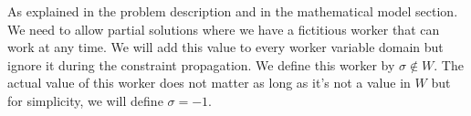 \documentclass[../../thesis.tex]{subfiles}
\begin{document}
As explained in the problem description and in the mathematical model section. 
We need to allow partial solutions where we have a fictitious worker that can work at any time.
We will add this value to every worker variable domain but ignore it during the constraint propagation. We define 
this worker by $\sigma \notin W$. The actual value of this worker does not matter as long as it's not a 
value in $W$ but for simplicity, we will define $\sigma = -1$.








\end{document}
